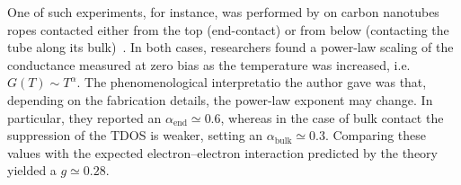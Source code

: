 One of such experiments, for instance, was performed by \citeauthor{bockrath1999luttinger} on carbon nanotubes ropes contacted either from the top (end-contact) or from below (contacting the tube along its bulk)~\cite{bockrath1999luttinger}. In both cases, researchers found a power-law scaling of the conductance measured at zero bias as the temperature was increased, i.e.\ $G(T) \sim T^\alpha$. The phenomenological interpretatio the author gave was that, depending on the fabrication details, the power-law exponent may change. In particular, they reported an $\alpha_{\text{end}}\simeq 0.6$, whereas in the case of bulk contact the suppression of the \gls{TDOS} is weaker, setting an $\alpha_{\text{bulk}}\simeq 0.3$. Comparing these values with the expected electron--electron interaction predicted by the theory yielded a $g\simeq 0.28$.

